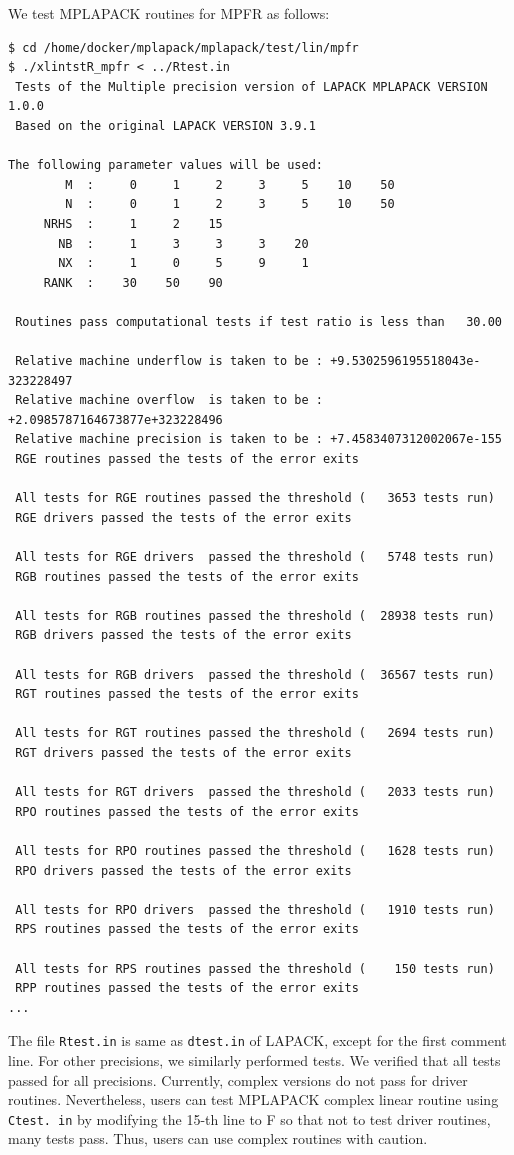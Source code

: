 \documentclass[12pt]{article}
\begin{document}
We test MPLAPACK routines for MPFR as follows:
\begin{verbatim}
$ cd /home/docker/mplapack/mplapack/test/lin/mpfr
$ ./xlintstR_mpfr < ../Rtest.in
 Tests of the Multiple precision version of LAPACK MPLAPACK VERSION 1.0.0
 Based on the original LAPACK VERSION 3.9.1

The following parameter values will be used:
        M  :     0     1     2     3     5    10    50
        N  :     0     1     2     3     5    10    50
     NRHS  :     1     2    15
       NB  :     1     3     3     3    20
       NX  :     1     0     5     9     1
     RANK  :    30    50    90

 Routines pass computational tests if test ratio is less than   30.00

 Relative machine underflow is taken to be : +9.5302596195518043e-323228497
 Relative machine overflow  is taken to be : +2.0985787164673877e+323228496
 Relative machine precision is taken to be : +7.4583407312002067e-155
 RGE routines passed the tests of the error exits

 All tests for RGE routines passed the threshold (   3653 tests run)
 RGE drivers passed the tests of the error exits

 All tests for RGE drivers  passed the threshold (   5748 tests run)
 RGB routines passed the tests of the error exits

 All tests for RGB routines passed the threshold (  28938 tests run)
 RGB drivers passed the tests of the error exits

 All tests for RGB drivers  passed the threshold (  36567 tests run)
 RGT routines passed the tests of the error exits

 All tests for RGT routines passed the threshold (   2694 tests run)
 RGT drivers passed the tests of the error exits

 All tests for RGT drivers  passed the threshold (   2033 tests run)
 RPO routines passed the tests of the error exits

 All tests for RPO routines passed the threshold (   1628 tests run)
 RPO drivers passed the tests of the error exits

 All tests for RPO drivers  passed the threshold (   1910 tests run)
 RPS routines passed the tests of the error exits

 All tests for RPS routines passed the threshold (    150 tests run)
 RPP routines passed the tests of the error exits
...
\end{verbatim}
The file {\tt Rtest.in} is same as {\tt dtest.in} of LAPACK, except for the first comment line. 
For other precisions, we similarly performed tests. We verified that all tests passed for all precisions.
Currently, complex versions do not pass for driver routines. Nevertheless, users can test MPLAPACK complex linear routine using {\tt Ctest. in}  by modifying the 15-th line to F so that not to test driver routines, many tests pass. Thus, users can use complex routines with caution.
\end{document}

